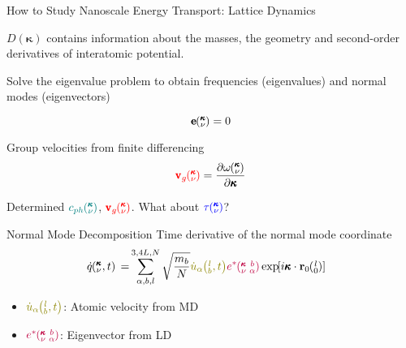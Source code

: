 \documentclass{beamer}
\newcommand{\EXP}[1]{\exp\mspace{-5.0mu}\left[#1\right]\mspace{-3.0mu}}
\newcommand{\lO}{\mspace{-4.0mu}\left(\mspace{-8.0mu}
\begin{smallmatrix}&l \\&0\end{smallmatrix}
\mspace{-3.0mu}\right)}
\newcommand{\kvba}{\mspace{-4.0mu}\left(\mspace{-8.0mu}
\begin{smallmatrix} &\pmb{\kappa} &b \\ &\nu &\alpha\end{smallmatrix}
\mspace{-3.0mu}\right)}
\newcommand{\kvt}{\mspace{-4.0mu}\left(\mspace{-8.0mu}
\begin{smallmatrix}&\pmb{\kappa} \\&\nu\end{smallmatrix}
\mspace{-2.0mu},t\right)}
\newcommand{\kv}{\mspace{-4.0mu}\left(\mspace{-8.0mu}
\begin{smallmatrix}&\pmb{\kappa} \\&\nu\end{smallmatrix}
\mspace{-3.0mu}\right)}
\newcommand{\lbt}{\mspace{-4.0mu}\left(\mspace{-8.0mu}
\begin{smallmatrix}&l \\&b\end{smallmatrix}\mspace{-2.0mu},t\right)}
\begin{document}
\begin{frame}{How to Study Nanoscale Energy Transport: Lattice Dynamics}

$D(\pmb{\kappa})$ contains information about the masses, the geometry and second-order derivatives of interatomic potential.

Solve the eigenvalue problem to obtain frequencies (eigenvalues) and normal modes (eigenvectors)

\begin{equation}
[D(\pmb{\kappa})-I\omega^2\kv]\pmb{\mathrm{e}}\kv = 0
\end{equation}

Group velocities from finite differencing
\begin{equation}\label{EQ:NMD:vg}
\begin{split}
\textcolor{red}{\pmb{\mathrm{v}}_{g}\kv}=\frac{\partial \omega \kv}{\partial \pmb{\kappa}}
\end{split}
\end{equation}

Determined $\textcolor{teal}{c_{ph}\kv}$, $\textcolor{red}{\pmb{\mathrm{v}}_{g}\kv}$. What about $\textcolor{blue}{\tau\kv}$?

\end{frame}

\begin{frame}{Normal Mode Decomposition}
Time derivative of the normal mode coordinate
\begin{equation}\label{EQ:NMD:qdot}
\begin{split}
\dot{q}\kvt{}{}{}=&\sum_{\alpha, b, l}^{3,4L,N}\sqrt{\frac{m_b}{N}}\textcolor{olive}{\dot{u}_{\alpha}\lbt}\textcolor{purple}{e^*\kvba}\EXP{i\pmb{\kappa}\cdot\mathbf{r}_0\lO}
\end{split}
\end{equation}
\begin{itemize}
\item $\textcolor{olive}{\dot{u}_{\alpha}\lbt}$: Atomic velocity from MD
\item $\textcolor{purple}{e^*\kvba}$: Eigenvector from LD
\end{itemize}
\end{frame}
\end{document}
